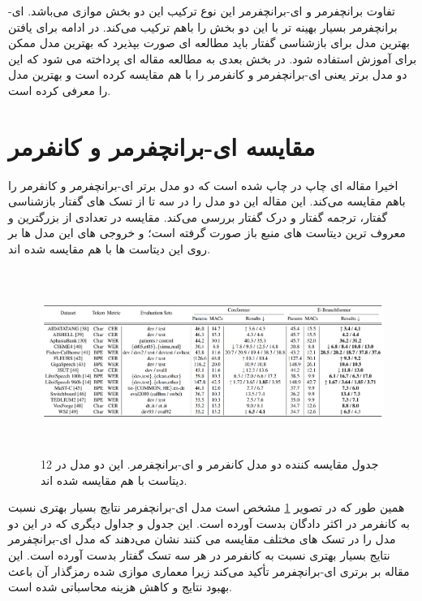 تفاوت 
برانچفرمر
و
ای-برانچفرمر
این نوع ترکیب این دو بخش موازی می‌باشد.
ای-برانچفرمر بسیار بهینه تر با این دو بخش را باهم ترکیب می‌کند.
در ادامه برای یافتن بهترین مدل برای 
بازشناسی گفتار
باید مطالعه ای صورت بپذیرد که بهترین مدل ممکن برای آموزش استفاده شود.
در بخش بعدی به مطالعه مقاله ای پرداخته می شود که این دو مدل برتر یعنی ای-برانچفرمر و کانفرمر را با هم مقایسه کرده است و بهترین مدل را معرفی کرده است.



\section{مقایسه ای-برانچفرمر و کانفرمر}\label{sec4}

اخیرا مقاله ای چاپ در چاپ شده است که دو مدل برتر ای-برانچفرمر و کانفرمر را باهم مقایسه می‌کند.\cite{peng2023comparative}
این مقاله این دو مدل را در سه تا از تسک های گفتار بازشناسی گفتار، ترجمه گفتار و درک گفتار بررسی می‌کند. مقایسه در تعدادی از بزرگترین و معروف ترین دیتاست های منبع باز صورت گرفته است؛ و خروجی های این مدل ها بر روی این دیتاست ها با هم مقایسه شده اند.

 \begin{figure}[H]
  \centering
  \includegraphics[width=1\textwidth,height=6cm]{Images/Chapter2/confvsbranch.png}
  \caption{
  جدول مقایسه کننده دو مدل کانفرمر و ای-برانچفرمر. این دو مدل در 12 دیتاست با هم مقایسه شده اند.
  }
  \label{fig:confvsbranch}
\end{figure}

همین طور که در تصویر \ref{fig:confvsbranch}
مشخص است مدل ای-برانچفرمر نتایج بسیار بهتری نسبت به کانفرمر در اکثر دادگان بدست آورده است.
این جدول و جداول دیگری که در این دو مدل را در تسک های مختلف مقایسه می کنند نشان می‌دهند که مدل ای-برانچفرمر نتایج بسیار بهتری نسبت به کانفرمر در هر سه تسک گفتار بدست آورده است. این مقاله بر برتری ای-برانچفرمر تأکید می‌کند زیرا معماری موازی شده رمزگذار آن باعث بهبود نتایج و کاهش هزینه محاسباتی شده است.

